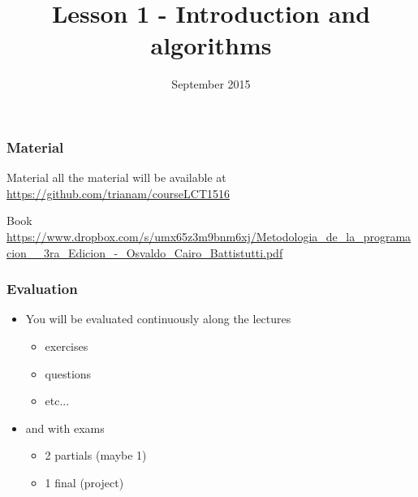


\title[Lesson 1]{\textbf{Lesson 1 - Introduction and algorithms}}
\date[7/9/15]{ September 2015}



\begin{frame}[plain]
  \titlepage
\end{frame}

\begin{frame}
  \frametitle{Material}
  \begin{block}{Material}
    all the material will be available at \url{https://github.com/trianam/courseLCT1516}
  \end{block}
  \pause
  \begin{block}{Book}
    \url{https://www.dropbox.com/s/umx65z3m9bnm6xj/Metodologia_de_la_programacion__3ra_Edicion_-_Osvaldo_Cairo_Battistutti.pdf}
  \end{block}
\end{frame}

\begin{frame}
  \frametitle{Evaluation}
    \begin{itemize}
  \item You will be evaluated continuously along the lectures
    \begin{itemize}
    \item exercises
    \item questions
    \item etc...
    \end{itemize}
  \item and with exams
    \begin{itemize}
    \item 2 partials (maybe 1)
    \item 1 final (project)
    \end{itemize}
  \end{itemize}
\end{frame}


